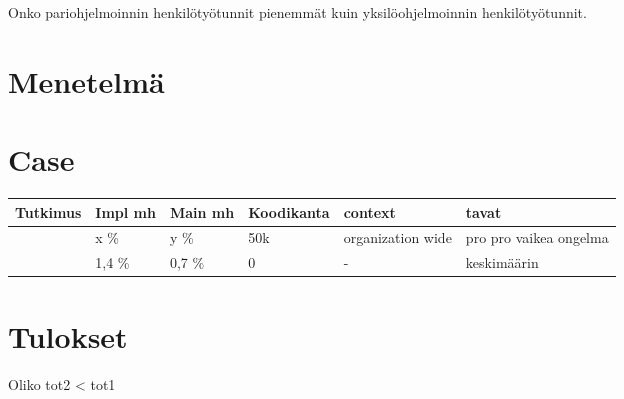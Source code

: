 \documentclass[finnish]{tktltiki2}
\theoremstyle{definition}
\theoremstyle{remark}
\begin{document}
Onko pariohjelmoinnin henkilötyötunnit pienemmät kuin yksilöohjelmoinnin henkilötyötunnit.
\section{Menetelmä}
\section{Case}
\begin{center}
    \begin{tabular}{ | l | l | l | l | l | p{4cm} |}
    \hline
    Tutkimus & Impl mh & Main mh & Koodikanta & context & tavat \\ \hline
    	~\cite{case} & x \% & y \% & 50k & organization wide & pro pro vaikea ongelma \\ \hline
	~\cite{costandbenefit} & 1,4 \% & 0,7 \% & 0 & - & keskimäärin \\ \hline
    \end{tabular}
\end{center}

\section{Tulokset}
Oliko tot2 < tot1


%
%
% 
%



\end{document}
